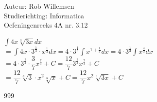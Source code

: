 \documentclass[a4paper]{article}
\newcommand{\dint}{\displaystyle\int}
\begin{document}
\noindent \large Auteur: Rob Willemsen \\
\noindent \large Studierichting: Informatica \\
\noindent \large Oefeningenreeks 4A nr. 3.12 \\

\medskip

\normalsize

$\dint 4x \sqrt[3]{3x}dx$\\

$=\dint 4x \cdot 3^{\tfrac{1}{3}} \cdot x^{\tfrac{1}{3}} dx = 4 \cdot 3^{\tfrac{1}{3}} \dint x^{1 + \tfrac{1}{3}} dx = 4 \cdot 3^{\tfrac{1}{3}} \dint x^{\tfrac{4}{3}} dx$ \\

$= 4 \cdot 3^{\tfrac{1}{3}} \cdot \dfrac{3}{7} x^{\tfrac{7}{3}} + C = \dfrac{12}{7} 3^{\tfrac{1}{3}} x^{\tfrac{7}{3}} + C$ \\

$= \dfrac{12}{7} \sqrt[3]{3} \cdot x^2\sqrt[3]{x} + C = \dfrac{12}{7}x^2 \sqrt[3]{3x} + C$ \\

\begin{thebibliography}{999}
\end{thebibliography}
\end{document}
